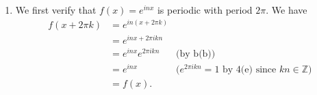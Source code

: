 \documentclass[oneside]{article}
\newcommand\bbZ{\mathbb{Z}}
\begin{document}
\begin{enumerate}[label=\textbf{\arabic*.}]
\begin{enumerate}[label=\textbf{(\alph*)}]
    We list the identities:\begin{align}
      \cos(\theta + \vartheta)
        &= \cos\theta\cos\vartheta
        - \sin\theta\sin\vartheta\text{,} \label{eq:cosplus} \\
      \cos(\theta - \vartheta)
        &= \cos\theta\cos\vartheta
        + \sin\theta\sin\vartheta\text{,} \label{eq:cosminus} \\
      \sin(\theta + \vartheta)
        &= \sin\theta\cos\vartheta
        + \cos\theta\sin\vartheta\text{,} \label{eq:sinplus} \\
      \sin(\theta - \vartheta)
        &= \sin\theta\cos\vartheta
        - \cos\theta\sin\vartheta\text{.} \label{eq:sinminus}
    \end{align}

    Subtracting the LHS and RHS of \eqref{eq:cosplus} from \eqref{eq:cosminus},
    \[
      2\sin\theta\sin\vartheta
      = \cos(\theta - \vartheta) - \cos(\theta + \vartheta) \text{.}
    \] Similarly adding \eqref{eq:sinplus} and \eqref{eq:sinminus},\[
      2\sin\theta\cos\vartheta
      = \sin(\theta + \vartheta) + \sin(\theta - \vartheta) \text{.}
    \]\qed

  \end{enumerate}

  \item
  We first verify that $f(x) = e^{inx}$ is periodic with period $2\pi$. We have
  \begin{align*}
    f(x + 2\pi k) &= e^{in(x + 2\pi k)} \\
    &= e^{inx+2\pi i k n} \\
    &= e^{inx}e^{2\pi i k n} &\text{(by b(b))} \\
    &= e^{inx} &\text{($e^{2\pi i k n} = 1$ by 4(e) since $kn\in\bbZ$)} \\
    &= f(x)\text{.}
  \end{align*}


\end{enumerate}
\end{document}
